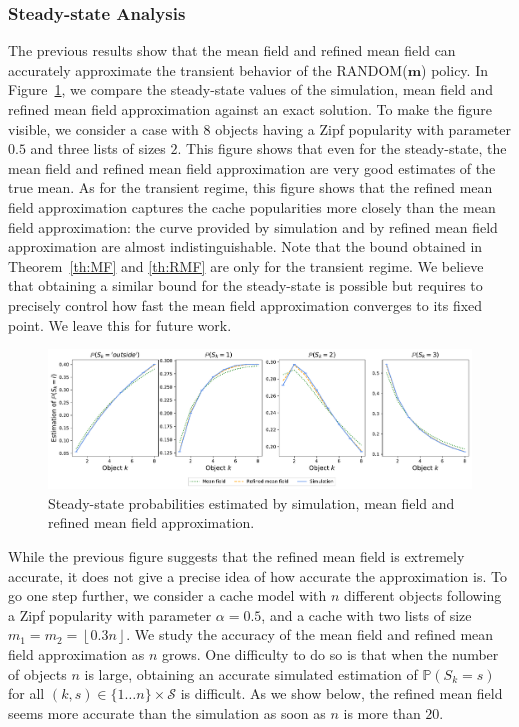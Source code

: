 \documentclass[acmsmall]{acmart}
\newcommand\bm{\mathbf{m}}
\newcommand\calS{\mathcal{S}}
\newcommand\Proba[1]{\mathbb{P}\left(#1\right)} %
\newcommand\floor[1]{\left\lfloor#1\right\rfloor}
\begin{document}

\subsubsection{Steady-state Analysis}


The previous results show that the mean field and refined mean field can accurately approximate the transient behavior of the RANDOM($\bm$) policy. In Figure~\ref{fig:steady_state_cache}, we compare the steady-state values of the simulation, mean field and refined mean field approximation against an exact solution. To make the figure visible, we consider a case with $8$ objects having a Zipf popularity with parameter $0.5$ and three lists of sizes $2$. This figure shows that even for the steady-state, the mean field and refined mean field approximation are very good estimates of the true mean. As for the transient regime, this figure shows that the refined mean field approximation captures the cache popularities more closely than the mean field approximation: the curve provided by simulation and by refined mean field approximation are almost indistinguishable. Note that the bound obtained in Theorem~\ref{th:MF} and \ref{th:RMF} are only for the transient regime. We believe that obtaining a similar bound for the steady-state is possible but requires to precisely control how fast the mean field approximation converges to its fixed point. We leave this for future work.

\begin{figure}[ht]
\includegraphics[width=\linewidth]{cache_steady_state}
  \caption{Steady-state probabilities estimated by simulation, mean field and refined mean field approximation.}
  \label{fig:steady_state_cache}
\end{figure}

While the previous figure suggests that the refined mean field is extremely accurate, it does not give a precise idea of how accurate the approximation is. To go one step further, we consider a cache model with $n$ different objects following a Zipf popularity with parameter $\alpha=0.5$, and a cache with two lists of size $m_1=m_2=\floor{0.3n}$. We study the accuracy of the mean field and refined mean field approximation as $n$ grows. One difficulty to do so is that when the number of objects $n$ is large, obtaining an accurate simulated estimation of $\Proba{S_k=s}$ for all $(k, s) \in\{1\dots n\}\times \calS$ is difficult. As we show below, the refined mean field seems more accurate than the simulation as soon as $n$ is more than $20$. 
\end{document}

